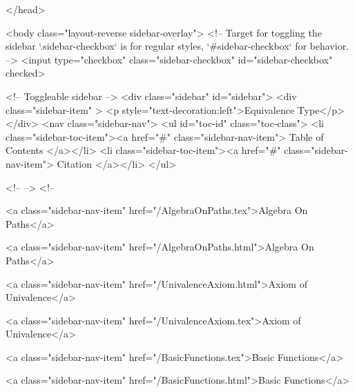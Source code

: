   
</head>




  <body class="layout-reverse sidebar-overlay">
    <!-- Target for toggling the sidebar `.sidebar-checkbox` is for regular
     styles, `#sidebar-checkbox` for behavior. -->
<input type="checkbox" class="sidebar-checkbox" id="sidebar-checkbox" checked>

<!-- Toggleable sidebar -->
<div class="sidebar" id="sidebar">
  <div class="sidebar-item" >
    <p style="text-decoration:left">Equivalence Type</p>
  </div>
  <nav class="sidebar-nav">
    <ul id="toc-id" class="toc-class">
  <li class="sidebar-toc-item"><a href="#" class="sidebar-nav-item"> Table of Contents </a></li>
  <li class="sidebar-toc-item"><a href="#" class="sidebar-nav-item"> Citation </a></li>
</ul>


    <!--  -->
    <!-- 
      
    
      
    
      
    
      
        
      
    
      
        
          <a class="sidebar-nav-item" href="/AlgebraOnPaths.tex">Algebra On Paths</a>
        
      
    
      
        
          <a class="sidebar-nav-item" href="/AlgebraOnPaths.html">Algebra On Paths</a>
        
      
    
      
        
          <a class="sidebar-nav-item" href="/UnivalenceAxiom.html">Axiom of Univalence</a>
        
      
    
      
        
          <a class="sidebar-nav-item" href="/UnivalenceAxiom.tex">Axiom of Univalence</a>
        
      
    
      
        
          <a class="sidebar-nav-item" href="/BasicFunctions.tex">Basic Functions</a>
        
      
    
      
        
          <a class="sidebar-nav-item" href="/BasicFunctions.html">Basic Functions</a>
        
      
    

